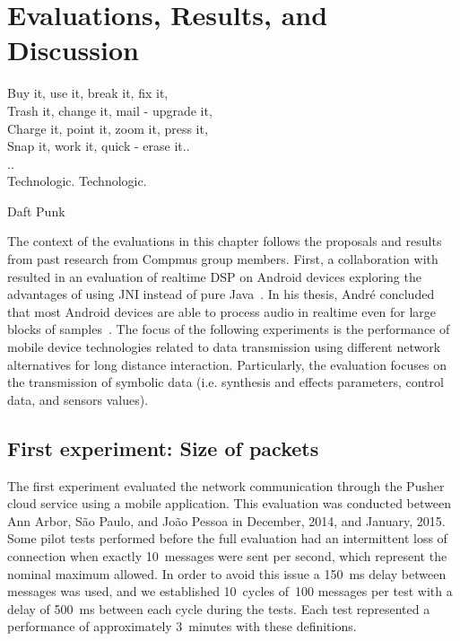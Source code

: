 \chapter{Evaluations, Results, and Discussion}
\label{cap:evaluations}
 
 \epigraph{
 	Buy it, use it, break it, fix it,\\
 	Trash it, change it, mail - upgrade it,\\
 	Charge it, point it, zoom it, press it,\\
 	Snap it, work it, quick - erase it..\\
 	..\\
 	Technologic. Technologic.}
 {Daft Punk}

The context of the evaluations in this chapter follows the proposals and results from past research from Compmus group members.
First, a collaboration with  resulted in an evaluation of realtime DSP on Android devices exploring the advantages of using JNI instead of pure Java~\citep{deCarvalhoJunior2013fftbenchmark}.
In his thesis, André concluded that most Android devices are able to process audio in realtime even for large blocks of samples~\citep{bianchi2014processamento}.
The focus of the following experiments is the performance of mobile device technologies related to data transmission using different network alternatives for long distance interaction.
Particularly, the evaluation focuses on the transmission of symbolic data (i.e. synthesis and effects parameters, control data, and sensors values).

\section{First experiment: Size of packets}
\label{sec:firsttrial}

The first experiment evaluated the network communication through the Pusher cloud service using a mobile application.
This evaluation was conducted between Ann Arbor, São Paulo, and João Pessoa in December, 2014, and January, 2015.
Some pilot tests performed before the full evaluation had an intermittent loss of connection when exactly 10~messages were sent per second, which represent the nominal maximum allowed.
In order to avoid this issue a 150~ms delay between messages was used, and we established 10~cycles of~100 messages per test with a delay of 500~ms between each cycle during the tests.
Each test represented a performance of approximately 3~minutes with these definitions.


